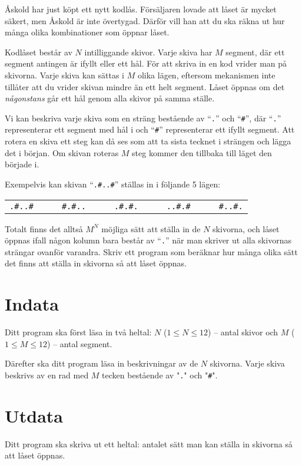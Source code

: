 Åskold har just köpt ett nytt kodlås.
Försäljaren lovade att låset är mycket säkert, men Åskold är inte övertygad.
Därför vill han att du ska räkna ut hur många olika kombinationer som öppnar låset.

Kodlåset består av $N$ intilliggande skivor.
Varje skiva har $M$ segment, där ett segment antingen är ifyllt eller ett hål.
För att skriva in en kod vrider man på skivorna.
Varje skiva kan sättas i $M$ olika lägen, eftersom mekanismen inte tillåter att du vrider skivan mindre än ett helt segment.
Låset öppnas om det \emph{någonstans} går ett hål genom alla skivor på samma ställe.

Vi kan beskriva varje skiva som en sträng bestående av ``\texttt{.}'' och ``\texttt{\#}'',
där ``\texttt{.}'' representerar ett segment med hål i och ``\texttt{\#}'' representerar ett ifyllt segment.
Att rotera en skiva ett steg kan då ses som att ta sista tecknet i strängen och lägga det i början.
Om skivan roteras $M$ steg kommer den tillbaka till läget den började i.

Exempelvis kan skivan ``\texttt{.\#..\#}'' ställas in i följande 5 lägen:

\begin{center}
  \begin{tabular}{l l|l l l|l l l|l l l|l l}
    \texttt{.\#..\#}&&& \texttt{\#.\#..}&&&\texttt{.\#.\#.}&&&\texttt{..\#.\#}&&&\texttt{\#..\#.}
  \end{tabular}
\end{center}

Totalt finns det alltså $M^N$ möjliga sätt att ställa in de $N$ skivorna, och låset öppnas ifall någon kolumn bara består av ``\texttt{.}'' 
när man skriver ut alla skivornas strängar ovanför varandra. Skriv ett program som beräknar hur många olika sätt det finns att ställa in skivorna så att låset öppnas.

\section*{Indata}
Ditt program ska först läsa in två heltal: $N$ ($1\le N \le 12$)  -- antal skivor och $M$ ($1\le M \le 12$) -- antal segment.

Därefter ska ditt program läsa in beskrivningar av de $N$ skivorna.
Varje skiva beskrivs av en rad med $M$ tecken bestående av "\texttt{.}" och "\texttt{\#}".

\section*{Utdata}
Ditt program ska skriva ut ett heltal: antalet sätt man kan ställa in skivorna så att låset öppnas.

